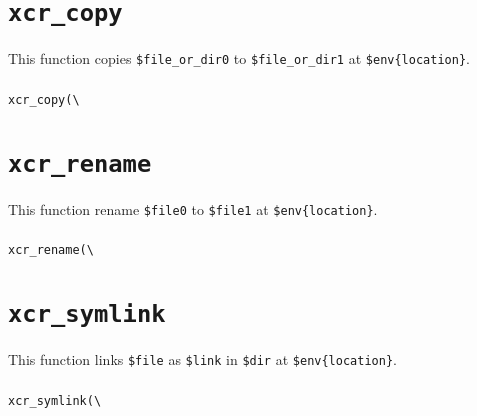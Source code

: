 \documentclass[a4paper,10pt]{report}
\def\|{\verb|} %|
\begin{document}
\section{\texttt{xcr\_copy}}

This function copies \texttt{\$file\_or\_dir0} to
\texttt{\$file\_or\_dir1} at \texttt{\$env\{location\}}.

\subsubsection{\format}

\begin{boxnote}
\begin{alltt}
xcr_copy(\|\|%\textit{env}, $file_or_dir0, $file_or_dir1);
\end{alltt}
\end{boxnote}
\vspace{\baselineskip}

\section{\texttt{xcr\_rename}}

This function rename \texttt{\$file0} to \texttt{\$file1} at
\texttt{\$env\{location\}}.

\subsubsection{\format}

\begin{boxnote}
\begin{alltt}
xcr_rename(\|\|%\textit{env}, $file0, $file1);
\end{alltt}
\end{boxnote}
\vspace{\baselineskip}

\section{\texttt{xcr\_symlink}}

This function links \texttt{\$file} as \texttt{\$link} in
\texttt{\$dir} at \texttt{\$env\{location\}}.

\subsubsection{\format}

\begin{boxnote}
\begin{alltt}
xcr_symlink(\|\|%\textit{env}, $file, $dir, $link);
\end{alltt}
\end{boxnote}
\vspace{\baselineskip}
\end{document}
